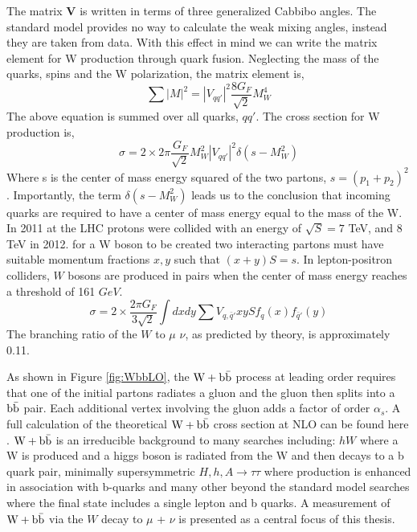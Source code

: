 The matrix {\bf V} is written in terms of three generalized Cabbibo angles.
The standard model provides no way to calculate the weak mixing angles, instead they
are taken from data.
With this effect in mind we can write the matrix element for W production through quark fusion.
Neglecting the mass of the quarks, spins and the W polarization, the matrix element is,
\begin{equation}
\sum|M|^{2}=|V_{qq'}|^{2}\frac{8G_{F}}{\sqrt{2}}M_{W}^{4}
\end{equation}
The above equation is summed over all quarks, $qq'$. The cross section for W production is,
\begin{equation}
\sigma=2\times2\pi\frac{G_{F}}{\sqrt{2}}M_{W}^{2}|V_{qq'}|^{2}\delta(s-M_{W}^{2})
\end{equation}
Where s is the center of mass energy squared of the two partons, $s=(p_{1}+p_{2})^{2}$.
Importantly, the term $\delta(s-M_{W}^{2})$ leads us to the 
conclusion that incoming quarks are required to have a center of mass energy
equal to the mass of the W. 
In 2011 at the LHC protons were collided with an energy of $\sqrt{S}=7$ TeV, and 8 TeV in 2012.
for a W boson to be created two interacting partons must have suitable
momentum fractions $x, y$ such that $(x+y)S=s$.
In lepton-positron colliders, $W$ bosons are produced in pairs when 
the center of mass energy reaches a threshold of 161 $GeV$. 
\begin{equation}
\sigma=2\times\frac{2\pi G_{F}}{3\sqrt{2}}\int{dxdy \sum{V_{q,\bar{q}'}}xyS f_{q}(x)f_{\bar{q}'}(y)}
\end{equation}
The branching ratio of the $W$ to $\mu$ $\nu$, as predicted by theory, is approximately 0.11. 

As shown in Figure \ref{fig:WbbLO}, the $\mathrm{W+\mathrm{b\bar{b}}}$ process at leading order requires that one of the initial partons
radiates a gluon and the gluon then splits into a $\mathrm{b\bar{b}}$ pair. Each additional
vertex involving the gluon adds a factor of order $\alpha_{s}$. A full
calculation of the theoretical $\mathrm{W+\mathrm{b\bar{b}}}$ cross section at NLO can be found here \cite{Campbell:2010ff, Badger:2010mg}.
$\mathrm{W+\mathrm{b\bar{b}}}$ is an irreducible background to many searches including:
$hW$ where a W is produced and a higgs boson is radiated from the W
and then decays to a b quark pair, minimally supersymmetric $H,h,A\rightarrow \tau\tau$
where production is enhanced in association with b-quarks and many other beyond the standard
model searches where the final state includes a single lepton and b quarks. 
A measurement of $\mathrm{W+\mathrm{b\bar{b}}}$ via the $W$ decay to $\mu$ + $\nu$ is presented as a 
central focus of this thesis.

